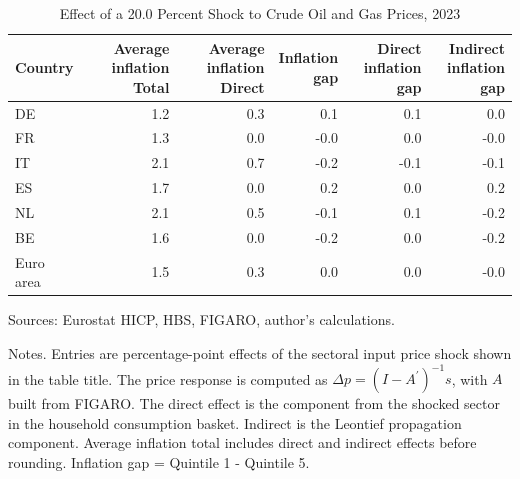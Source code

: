 \begin{table}[H]
\centering
\caption{Effect of a 20.0 Percent Shock to Crude Oil and Gas Prices, 2023}
\scriptsize
\setlength{\tabcolsep}{4.2pt}
\begin{tabular}{lrrrrr}
\toprule
Country & \shortstack{Average inflation\\Total} & \shortstack{Average inflation\\Direct} & \shortstack{Inflation\\gap} & \shortstack{Direct\\inflation gap} & \shortstack{Indirect\\inflation gap}
 \\
\midrule
DE & 1.2 & 0.3 & 0.1 & 0.1 & 0.0
 \\
FR & 1.3 & 0.0 & -0.0 & 0.0 & -0.0
 \\
IT & 2.1 & 0.7 & -0.2 & -0.1 & -0.1
 \\
ES & 1.7 & 0.0 & 0.2 & 0.0 & 0.2
 \\
NL & 2.1 & 0.5 & -0.1 & 0.1 & -0.2
 \\
BE & 1.6 & 0.0 & -0.2 & 0.0 & -0.2
 \\
Euro area & 1.5 & 0.3 & 0.0 & 0.0 & -0.0
 \\
\bottomrule
\end{tabular}
\par\vspace{0.35em}\footnotesize\noindent Sources: Eurostat HICP, HBS, FIGARO, author's calculations.
\par\vspace{0.25em}\footnotesize\noindent Notes. Entries are percentage-point effects of the sectoral input price shock shown in the table title. The price response is computed as $\Delta p = (I - A^{\prime})^{-1}s$, with $A$ built from FIGARO. The direct effect is the component from the shocked sector in the household consumption basket. Indirect is the Leontief propagation component. Average inflation total includes direct and indirect effects before rounding. Inflation gap = Quintile 1 - Quintile 5.
\end{table}
\vspace{0.6em}
